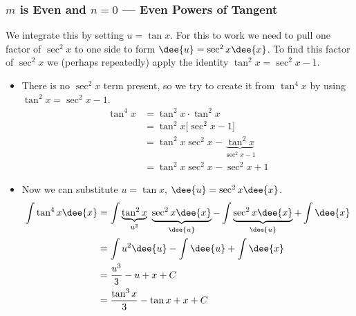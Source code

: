 \subsubsection*{$m$ is Even and $n=0$ --- Even Powers of Tangent}
We integrate this by setting $u=\tan x$. For this to work we need to pull one factor of
$\sec^2x$ to one side to form $\dee{u}=\sec^2x\dee{x}$. To find this factor of $\sec^2x$
we (perhaps repeatedly) apply the identity $\tan^2x=\sec^2x-1$.
\begin{eg}\label{eg:TRGINTi}
\soln
\begin{itemize}
 \item There is no $\sec^2x$ term present, so we try to create it from $\tan^4x$
by using $\tan^2x = \sec^2 x - 1$.
\begin{align*}
\tan^4 x &= \tan^2 x \cdot \tan^2 x \\
  &= \tan^2 x\big[\sec^2 x - 1\big]\\
  &=\tan^2x\sec^2 x-\underbrace{\tan^2 x}_{\sec^2x-1} \\
  & = \tan^2x\sec^2 x-\sec^2 x + 1
\end{align*}
\item Now we can substitute $u=\tan x$, $\dee{u}=\sec^2 x\dee{x}$.
\begin{align*}
\int \tan^4 x\dee{x} & =\int \underbrace{\tan^2x}_{u^2}\
                          \underbrace{\sec^2 x\dee{x}}_{\dee{u}}
                  - \int\underbrace{\sec^2 x\dee{x}}_{\dee{u}} + \int\dee{x} \\
&= \int u^2\dee{u} -\int \dee{u} + \int\dee{x} \\
&=\frac{u^3}{3}-u+x+C \\
&=\frac{\tan^3x}{3}-\tan x +x +C
\end{align*}


\end{itemize}
\end{eg}

